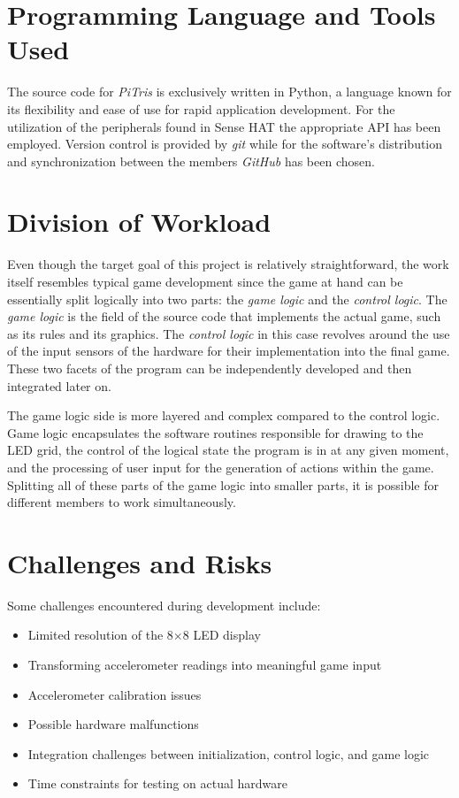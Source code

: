\documentclass[11pt,titlepage,openright]{book}
\begin{document}
\section{Programming Language and Tools Used}
The source code for \textit{PiTris} is exclusively written in Python, a language known for its flexibility and ease of use for rapid application development. For the utilization of the peripherals found in Sense HAT the appropriate API has been employed. Version control is provided by \textit{git} while for the software's distribution and synchronization between the members \textit{GitHub} has been chosen.

\section{Division of Workload}
Even though the target goal of this project is relatively straightforward, the work itself resembles typical game development since the game at hand can be essentially split logically into two parts: the \textit{game logic} and the \textit{control logic}. The \textit{game logic} is the field of the source code that implements the actual game, such as its rules and its graphics. The \textit{control logic} in this case revolves around the use of the input sensors of the hardware for their implementation into the final game. These two facets of the program can be independently developed and then integrated later on.

The game logic side is more layered and complex compared to the control logic. Game logic encapsulates the software routines responsible for drawing to the LED grid, the control of the logical state the program is in at any given moment, and the processing of user input for the generation of actions within the game. Splitting all of these parts of the game logic into smaller parts, it is possible for different members to work simultaneously.



\section{Challenges and Risks}
Some challenges encountered during development include:

\begin{itemize}
    \item Limited resolution of the 8$\times$8 LED display
    \item Transforming accelerometer readings into meaningful game input
    \item Accelerometer calibration issues
    \item Possible hardware malfunctions
    \item Integration challenges between initialization, control logic, and game logic
    \item Time constraints for testing on actual hardware
\end{itemize}
\end{document}
